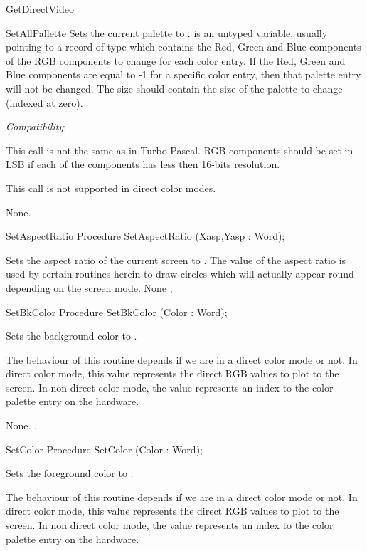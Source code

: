 \begin{function}{GetDirectVideo}
\begin{procedure}{SetAllPallette}
\Description
Sets the current palette to
.  is an untyped variable, usually pointing to a
record of type  which contains the Red, Green and Blue
components of the RGB components to change for each color entry. If
the Red, Green and Blue components are equal to -1 for a specific color
entry, then that palette entry will not be changed. The size should
contain the size of the palette to change (indexed at zero).

\textit{Compatibility}:

This call is not the same as in Turbo Pascal. RGB components should be
set in LSB if each of the components has less then 16-bits resolution.

This call is not supported in direct color modes.

\Errors
None.
\SeeAlso
{}
\end{procedure}
\begin{procedure}{SetAspectRatio}
\Declaration
Procedure SetAspectRatio (Xasp,Yasp : Word);

\Description
Sets the aspect ratio of the
current screen to . The value of the aspect ratio is used
by certain routines herein to draw circles which will actually appear round
depending on the screen mode.
\Errors
None
\SeeAlso
{}, 
\end{procedure}
\begin{procedure}{SetBkColor}
\Declaration
Procedure SetBkColor (Color : Word);

\Description
Sets the background color to
.

The behaviour of this routine depends if we are in a direct color
mode or not. In direct color mode, this value represents the direct
RGB values to plot to the screen. In non direct color mode, the value
represents an index to the color palette entry on the hardware.

\Errors
None.
\SeeAlso
{}, 
\end{procedure}
\begin{procedure}{SetColor}
\Declaration
Procedure SetColor (Color : Word);

\Description
Sets the foreground color to
.

The behaviour of this routine depends if we are in a direct color
mode or not. In direct color mode, this value represents the direct
RGB values to plot to the screen. In non direct color mode, the value
represents an index to the color palette entry on the hardware.


\end{procedure}
\end{function}
